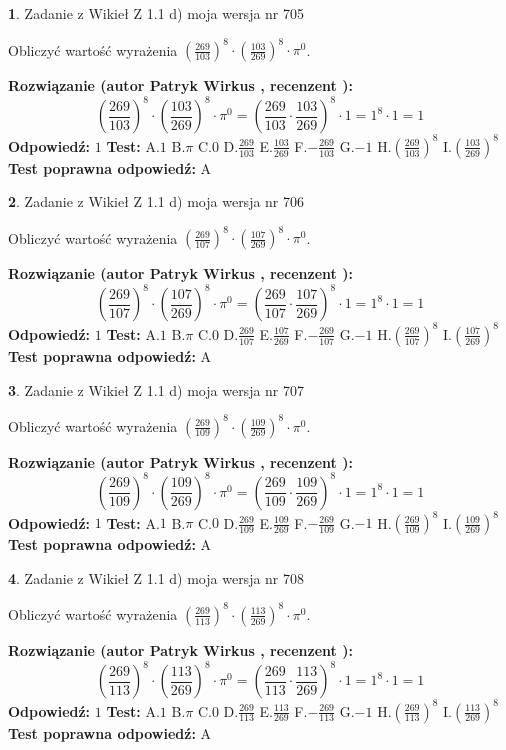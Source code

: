 \documentclass[12pt, a4paper]{article}
\theoremstyle{definition} %
\newtheorem{zad}{}
\newcommand{\zadStart}[1]{\begin{zad}#1\newline}
\newcommand{\zadStop}{\end{zad}}
\newcommand{\rozwStart}[2]{\noindent \textbf{Rozwiązanie (autor #1 , recenzent #2): }\newline}
\newcommand{\rozwStop}{\newline}
\newcommand{\odpStart}{\noindent \textbf{Odpowiedź:}\newline}
\newcommand{\odpStop}{\newline}
\newcommand{\testStart}{\noindent \textbf{Test:}\newline}
\newcommand{\testStop}{\newline}
\newcommand{\kluczStart}{\noindent \textbf{Test poprawna odpowiedź:}\newline}
\newcommand{\kluczStop}{\newline}
\begin{document}
\zadStart{Zadanie z Wikieł Z 1.1 d) moja wersja nr 705}

Obliczyć wartość wyrażenia $(\frac{269}{103})^{8} \cdot (\frac{103}{269})^{8} \cdot \pi^{0}$.
\zadStop
\rozwStart{Patryk Wirkus}{}
$$(\frac{269}{103})^{8} \cdot (\frac{103}{269})^{8} \cdot \pi^{0} = (\frac{269}{103} \cdot \frac{103}{269})^{8} \cdot 1 = 1^{8} \cdot 1 = 1$$
\rozwStop
\odpStart
$1$
\odpStop
\testStart
A.$1$ B.$\pi$ C.$0$ D.$\frac{269}{103}$ E.$\frac{103}{269}$
F.$-\frac{269}{103}$ G.$-1$
H.$(\frac{269}{103})^{8}$
I.$(\frac{103}{269})^{8}$
\testStop
\kluczStart
A
\kluczStop



\zadStart{Zadanie z Wikieł Z 1.1 d) moja wersja nr 706}

Obliczyć wartość wyrażenia $(\frac{269}{107})^{8} \cdot (\frac{107}{269})^{8} \cdot \pi^{0}$.
\zadStop
\rozwStart{Patryk Wirkus}{}
$$(\frac{269}{107})^{8} \cdot (\frac{107}{269})^{8} \cdot \pi^{0} = (\frac{269}{107} \cdot \frac{107}{269})^{8} \cdot 1 = 1^{8} \cdot 1 = 1$$
\rozwStop
\odpStart
$1$
\odpStop
\testStart
A.$1$ B.$\pi$ C.$0$ D.$\frac{269}{107}$ E.$\frac{107}{269}$
F.$-\frac{269}{107}$ G.$-1$
H.$(\frac{269}{107})^{8}$
I.$(\frac{107}{269})^{8}$
\testStop
\kluczStart
A
\kluczStop



\zadStart{Zadanie z Wikieł Z 1.1 d) moja wersja nr 707}

Obliczyć wartość wyrażenia $(\frac{269}{109})^{8} \cdot (\frac{109}{269})^{8} \cdot \pi^{0}$.
\zadStop
\rozwStart{Patryk Wirkus}{}
$$(\frac{269}{109})^{8} \cdot (\frac{109}{269})^{8} \cdot \pi^{0} = (\frac{269}{109} \cdot \frac{109}{269})^{8} \cdot 1 = 1^{8} \cdot 1 = 1$$
\rozwStop
\odpStart
$1$
\odpStop
\testStart
A.$1$ B.$\pi$ C.$0$ D.$\frac{269}{109}$ E.$\frac{109}{269}$
F.$-\frac{269}{109}$ G.$-1$
H.$(\frac{269}{109})^{8}$
I.$(\frac{109}{269})^{8}$
\testStop
\kluczStart
A
\kluczStop



\zadStart{Zadanie z Wikieł Z 1.1 d) moja wersja nr 708}

Obliczyć wartość wyrażenia $(\frac{269}{113})^{8} \cdot (\frac{113}{269})^{8} \cdot \pi^{0}$.
\zadStop
\rozwStart{Patryk Wirkus}{}
$$(\frac{269}{113})^{8} \cdot (\frac{113}{269})^{8} \cdot \pi^{0} = (\frac{269}{113} \cdot \frac{113}{269})^{8} \cdot 1 = 1^{8} \cdot 1 = 1$$
\rozwStop
\odpStart
$1$
\odpStop
\testStart
A.$1$ B.$\pi$ C.$0$ D.$\frac{269}{113}$ E.$\frac{113}{269}$
F.$-\frac{269}{113}$ G.$-1$
H.$(\frac{269}{113})^{8}$
I.$(\frac{113}{269})^{8}$
\testStop
\kluczStart
A
\kluczStop
\end{document}
